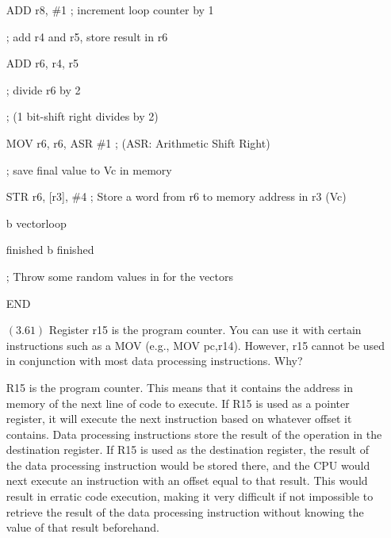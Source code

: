 \documentclass[letterpaper,10pt,titlepage]{article}
\begin{document}
\begin{enumerate}
		ADD		r8, \#1 ; increment loop counter by 1

		

        ; add r4 and r5, store result in r6

        ADD 	r6, r4, r5

		

        ; divide r6 by 2

        ; (1 bit-shift right divides by 2)

        MOV		r6, r6, ASR \#1 ; (ASR: Arithmetic Shift Right)

		

		; save final value to Vc in memory

		STR		r6, [r3], \#4 ; Store a word from r6 to memory address in r3 (Vc)


		b		vectorloop

		

finished	b 		finished



		; Throw some random values in for the vectors



		END


\item[$(3.61)$] Register r15 is the program counter. You can use it with certain instructions such as a MOV (e.g., MOV  pc,r14). However, r15 cannot be used in conjunction with most data processing instructions. Why?


R15 is the program counter. This means that it contains the address in memory of the next line of code to execute. If R15 is used as a pointer register, it will execute the next instruction based on whatever offset it contains. Data processing instructions store the result of the operation in the destination register. If R15 is used as the destination register, the result of the data processing instruction would be stored there, and the CPU would next execute an instruction with an offset equal to that result. This would result in erratic code execution, making it very difficult if not impossible to retrieve the result of the data processing instruction without knowing the value of that result beforehand.
\end{enumerate}
\end{document}
